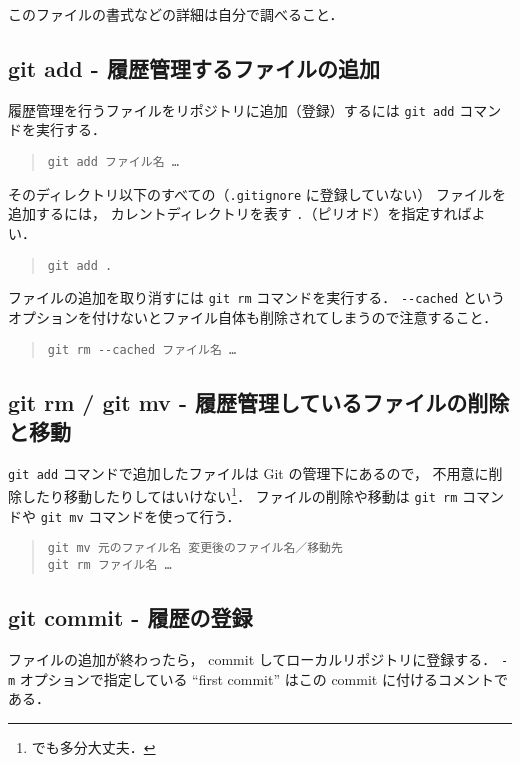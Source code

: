 \documentclass[a4j,10pt]{jarticle}
\begin{document}
このファイルの書式などの詳細は自分で調べること．

\subsection{git add - 履歴管理するファイルの追加}
履歴管理を行うファイルをリポジトリに追加（登録）するには
\verb|git add| コマンドを実行する．

\begin{quote}
\begin{verbatim}
git add ファイル名 …
\end{verbatim}
\end{quote}

そのディレクトリ以下のすべての（\verb|.gitignore| に登録していない）
ファイルを追加するには，
カレントディレクトリを表す \verb|.|（ピリオド）を指定すればよい．

\begin{quote}
\begin{verbatim}
git add .
\end{verbatim}
\end{quote}

ファイルの追加を取り消すには \verb|git rm| コマンドを実行する．
\verb|--cached|
というオプションを付けないとファイル自体も削除されてしまうので注意すること．

\begin{quote}
\begin{verbatim}
git rm --cached ファイル名 …
\end{verbatim}
\end{quote}

\subsection{git rm / git mv - 履歴管理しているファイルの削除と移動}
\verb|git add| コマンドで追加したファイルは Git の管理下にあるので，
不用意に削除したり移動したりしてはいけない\footnote{でも多分大丈夫．}．
ファイルの削除や移動は \verb|git rm| コマンドや
\verb|git mv| コマンドを使って行う．

\begin{quote}
\begin{verbatim}
git mv 元のファイル名 変更後のファイル名／移動先
git rm ファイル名 …
\end{verbatim}
\end{quote}

\subsection{git commit - 履歴の登録}
ファイルの追加が終わったら，
commit してローカルリポジトリに登録する．
\verb|-m| オプションで指定している
``first commit'' はこの commit に付けるコメントである．
\end{document}
